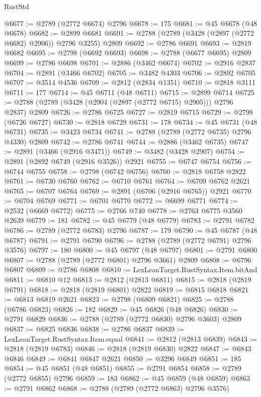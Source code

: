 \begin{lexlean}{RustStd}
\begin{coremodule}
@6677 := @2789 (@2772 @6674) @2796
@6678 := 175
@6681 := @45 @6678 (@48 @6678)
@6682 := @2899 @6681
@6691 := @2788 (@2789 (@3428 (@2897 (@2772 @6682) @2906)) @2796 @3255) @2809
@6692 := @2786 @6691
@6693 := @2819 @6682
@6695 := @2798 (@6692 @6693)
@6698 := @2788 (@6677 @6695) @2809
@6699 := @2786 @6698
@6701 := @2886 (@3462 @6674)
@6702 := @2916 @2837
@6704 := @2891 (@3466 @6702)
@6705 := @3482 @4303
@6706 := @2892 @6705
@6707 := @3514 @4536
@6709 := @2812 (@2834 @1351)
@6710 := @2818 @3111
@6711 := 177
@6714 := @45 @6711 (@48 @6711)
@6715 := @2899 @6714
@6725 := @2788 (@2789 (@3428 (@2904 (@2897 (@2772 @6715) @2905))) @2796 @2837) @2809
@6726 := @2786 @6725
@6727 := @2819 @6715
@6729 := @2798 (@6726 @6727)
@6730 := @2818 @6729
@6731 := 178
@6734 := @45 @6731 (@48 @6731)
@6735 := @3423 @6734
@6741 := @2788 (@2789 (@2772 @6735) @2796 @4330) @2809
@6742 := @2786 @6741
@6744 := @2886 (@3462 @6735)
@6747 := @2891 (@3466 (@2916 @3471))
@6749 := @3482 (@3428 @2907)
@6754 := @2891 (@2892 @6749 (@2916 @3526)) @2921
@6755 := @6747 @6754
@6756 := @6744 @6755
@6758 := @2798 (@6742 @6756)
@6760 := @2818 @6758 @2822
@6761 := @6730 @6760
@6762 := @6710 @6761
@6764 := @6709 @6762 @2621
@6765 := @6707 @6764
@6769 := @2891 (@6706 (@2916 @6765)) @2921
@6770 := @6704 @6769
@6771 := @6701 @6770
@6772 := @6699 @6771
@6774 := @2532 (@6669 @6772)
@6775 := @2766 @740
@6778 := @2763 @6775 @3560 @2639
@6779 := 181
@6782 := @45 @6779 (@48 @6779)
@6783 := @2791 @6782
@6786 := @2789 (@2772 @6783) @2796
@6787 := 179
@6790 := @45 @6787 (@48 @6787)
@6791 := @2791 @6790
@6796 := @2788 (@2789 (@2772 @6791) @2796 @3576)
@6797 := 180
@6800 := @45 @6797 (@48 @6797)
@6801 := @2791 @6800
@6807 := @2788 (@2789 (@2772 @6801) @2796 @3661) @2809
@6808 := @6796 @6807
@6809 := @2786 @6808
@6810 := LexLeanTarget.RustSyntax.Item.bitAnd
@6811 := @6810 @12
@6813 := @2812 (@2813 @6811)
@6815 := @2818 (@2819 @6791)
@6818 := @2818 (@2819 @6801) @2822
@6819 := @6815 @6818
@6821 := @6813 @6819 @2621
@6823 := @2798 (@6809 @6821)
@6825 := @2788 (@6786 @6823)
@6826 := 182
@6829 := @45 @6826 (@48 @6826)
@6830 := @2791 @6829
@6836 := @2788 (@2789 (@2772 @6830) @2796 @3603) @2809
@6837 := @6825 @6836
@6838 := @2786 @6837
@6839 := LexLeanTarget.RustSyntax.Item.equal
@6841 := @2812 (@2813 @6839)
@6843 := @2818 (@2819 @6783)
@6846 := @2818 (@2819 @6830) @2822
@6847 := @6843 @6846
@6849 := @6841 @6847 @2621
@6850 := @3296 @6849
@6851 := 185
@6854 := @45 @6851 (@48 @6851)
@6855 := @2791 @6854
@6858 := @2789 (@2772 @6855) @2796
@6859 := 183
@6862 := @45 @6859 (@48 @6859)
@6863 := @2791 @6862
@6868 := @2788 (@2789 (@2772 @6863) @2796 @3576)

\end{coremodule}
\end{lexlean}
